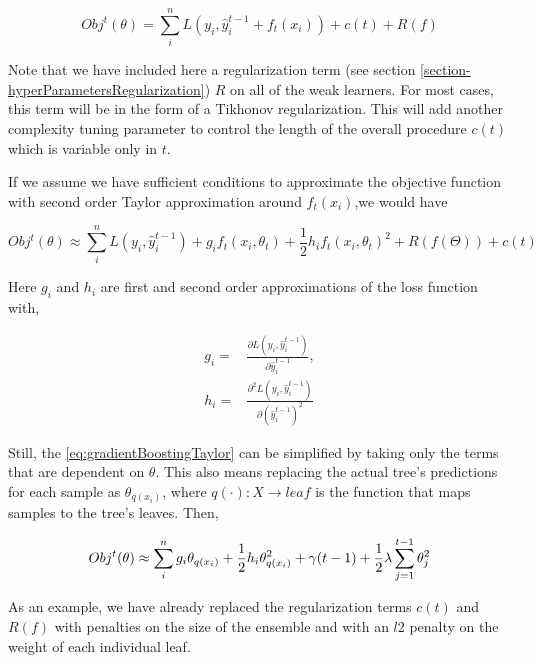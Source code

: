 \begin{appendices}
\begin{equation}
Obj^t(\theta) = \sum_i^n L(y_i, \hat{y}^{t-1}_i + f_t(x_i) ) + c(t) + R(f)
\end{equation}


Note that we have included here a regularization term (see section \cref{section-hyperParametersRegularization}) $R$ on all of the weak learners.
For most cases, this term will be in the form of a Tikhonov regularization.
This will add another complexity tuning parameter to control the length of the overall procedure $c(t)$ which is variable only in $t$.

If we assume we have sufficient conditions to approximate the objective function with second order Taylor approximation around $f_t(x_i)$,we would have

\begin{equation}\label{eq:gradientBoostingTaylor}
Obj^t(\theta) \approx \sum_i^n {L(y_i, \hat{y}^{t-1}_i) + g_i f_t(x_i,\theta_t) + \frac{1}{2} h_i {f_t(x_i,\theta_t)}^2 } + R(f(\Theta)) + c(t)
\end{equation}

Here $g_i$ and $h_i$ are first and second order approximations of the loss function with,

\begin{equation}
\begin{split}
g_i = & \frac{\partial L(y_i, \hat{y}^{t-1}_i)}{\partial \hat{y}^{t-1}_i},  \\
h_i = & \frac{\partial^2 L(y_i, \hat{y}^{t-1}_i)}{\partial {(\hat{y}^{t-1}_i)}^2 }
\end{split}
\end{equation}

Still, the \cref{eq:gradientBoostingTaylor} can be simplified by taking only the terms that are dependent on $\theta$.
This also means replacing the actual tree's predictions for each sample as $\theta_{q(x_i)}$, where $q(\cdot): X \rightarrow leaf$ is the function that maps samples to the tree's leaves. Then,


\begin{equation}\label{eq:gb-objSteps1}
Obj^t(\theta) \approx \sum_i^n {g_i \theta_{q(x_i)} + \frac{1}{2} h_i \theta_{q(x_i)}^2 } + \gamma ({t-1}) + \frac{1}{2}\lambda \sum_{j=1}^{t-1} \theta_j^2 \\
\end{equation}

As an example, we have already replaced the regularization terms $c(t)$ and $R(f)$ with penalties on the size of the ensemble and with an $l$2 penalty on the weight of each individual leaf.


\end{appendices}

